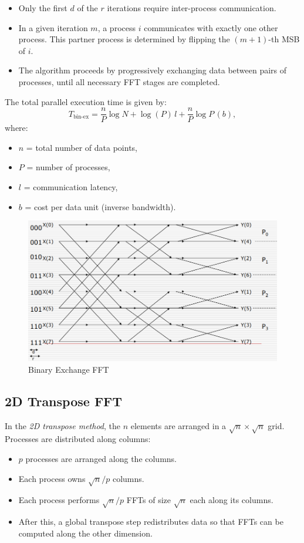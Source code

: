 \documentclass[12pt]{book}
\begin{document}
\begin{itemize}
    \item Only the first $d$ of the $r$ iterations require inter-process communication. 
    \item In a given iteration $m$, a process $i$ communicates with exactly one other process. This partner process is determined by flipping the $(m+1)$-th MSB of $i$. 
    \item The algorithm proceeds by progressively exchanging data between pairs of processes, until all necessary FFT stages are completed.
\end{itemize}

The total parallel execution time is given by:
\[
T_{\text{bin-ex}} = \frac{n}{P}\log N + \log(P)\,l + \frac{n}{P}\log P \,(b),
\]
where:
\begin{itemize}
    \item $n$ = total number of data points,
    \item $P$ = number of processes,
    \item $l$ = communication latency,
    \item $b$ = cost per data unit (inverse bandwidth).
\end{itemize}

\begin{figure}[ht]
    \centering
    \includegraphics[width=0.6\linewidth]{images/binaryexchangefft.png}
    \caption{Binary Exchange FFT}
    \label{fig:Binaryexc}
\end{figure}

\subsection*{2D Transpose FFT}
In the \textit{2D transpose method}, the $n$ elements are arranged in a $\sqrt{n} \times \sqrt{n}$ grid. Processes are distributed along columns:
\begin{itemize}
    \item $p$ processes are arranged along the columns.
    \item Each process owns $\sqrt{n}/p$ columns.
    \item Each process performs $\sqrt{n}/p$ FFTs of size $\sqrt{n}$ each along its columns.
    \item After this, a global transpose step redistributes data so that FFTs can be computed along the other dimension.
\end{itemize}
\end{document}
